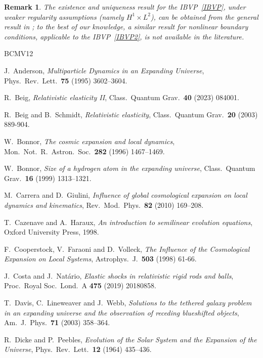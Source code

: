 \documentclass[10pt]{amsart}
\newtheorem{Remark}[Thm]{Remark}
\begin{document}
\begin{Remark}
The existence and uniqueness result for the IBVP~\eqref{IBVP}, under weaker regularity assumptions (namely $H^1 \times L^2$), can be obtained from the general result in \cite[Theorem~6.2.2]{CH98}; to the best of our knowledge, a similar result for nonlinear boundary conditions, applicable to the IBVP~\eqref{IBVP2}, is not available in the literature.
\end{Remark}
%
%
%
\begin{thebibliography}{BCMV12}

J.~Anderson, \emph{Multiparticle Dynamics in an Expanding Universe}, Phys.\ Rev.\ Lett.\ {\bf 75} (1995) 3602--3604.

R.~Beig, \emph{Relativistic elasticity II}, Class.\ Quantum Grav.\ {\bf 40} (2023) 084001.

R.~Beig and B.~Schmidt, \emph{Relativistic elasticity}, Class.\ Quantum Grav.\ {\bf 20} (2003) 889-904.

W.~Bonnor, \emph{The cosmic expansion and local dynamics}, Mon.\ Not.\ R.\ Astron.\ Soc.\ {\bf 282} (1996) 1467--1469.

W.~Bonnor, \emph{Size of a hydrogen atom in the expanding universe}, Class.\ Quantum Grav.\ {\bf 16} (1999) 1313--1321.

M.~Carrera and D.~Giulini, \emph{Influence of global cosmological expansion on local dynamics and kinematics}, Rev.\ Mod.\ Phys.\ {\bf 82} (2010) 169--208.

T.~Cazenave and A.~Haraux, \emph{An introduction to semilinear evolution equations}, Oxford University Press, 1998.

F.~Cooperstock, V.~Faraoni and D.~Volleck, \emph{The Influence of the Cosmological Expansion on Local Systems}, Astrophys.\ J.\ {\bf 503} (1998) 61-66.

J.~Costa and J.~Nat\'ario, \emph{Elastic shocks in relativistic rigid rods and balls}, Proc.\ Royal Soc.\ Lond.\ A {\bf 475} (2019) 20180858.

T.~Davis, C.~Lineweaver and J.~Webb, \emph{Solutions to the tethered galaxy problem in an expanding universe and the observation of receding blueshifted objects}, Am.\ J.\ Phys.\ {\bf 71} (2003) 358--364.

R.~Dicke and P.~Peebles, \emph{Evolution of the Solar System and the Expansion of the Universe}, Phys.\ Rev.\ Lett.\ {\bf 12} (1964) 435--436.


\end{thebibliography}
\end{document}
